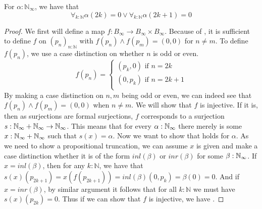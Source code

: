 \documentclass{../util/zariski-small}
\begin{document}
\begin{theorem}
  For $\alpha:\mathbb N_\infty$, 
  we have that 
  \begin{equation}\label{eqnLLPO}
    \forall_{k:\mathbb N} \alpha(2k) = 0  \vee \forall_{k:\mathbb N} \alpha(2k+1) = 0
  \end{equation}
\end{theorem}
\begin{proof}
  We first will define a map $f:B_\infty \to B_\infty \times B_\infty$. 
  Because of , it is sufficient to define $f$ on $(p_n)_{n:\mathbb N}$ with 
  $f(p_n) \wedge f(p_m) = (0,0)$ for $n\neq m$. 
  To define $f(p_n)$, we use a case distinction on whether $n$ is odd or even. 
  \begin{equation}
    f(p_n) =\begin{cases}
      (p_k,0) \text{ if } n = 2k\\
      (0,p_k) \text{ if } n = 2k+1\\
    \end{cases}
  \end{equation}
  By making a case distinction on $n,m$ being odd or even, 
  we can indeed see that $f(p_n) \wedge f(p_m) = (0,0)$ when $n\neq m$. 
  We will show that $f$ is injective. 
  If it is, then as surjections are formal surjections, $f$ corresponds to a surjection $s:\mathbb{N}_{\infty} + \mathbb{N}_{\infty} \to \mathbb{N}_{\infty}$.
  This means that for every $\alpha:\mathbb{N}_{\infty}$ there merely is some $x:\mathbb{N}_{\infty} + \mathbb{N}_{\infty}$ such that $s(x) = \alpha$. 
  Now we want to show that  holds for $\alpha$. 
  As we need to show a propositional truncation, we can assume $x$ is given and make a case distinction whether 
  it is of the form $inl(\beta)$ or $inr(\beta)$ for some $\beta:\mathbb{N}_{\infty}$. 
  If $x = inl(\beta)$, then for any $k:\mathbb N$, we have that 
  $s(x) (p_{2k+1}) = x(f(p_{2k+1})) = inl(\beta) (0,p_k)  = \beta(0) = 0$. 
  And if $x=inr(\beta)$, by similar argument it follows that for all $k:\mathbb N$
  we must have $s(x)(p_{2k}) = 0$. 
  Thus if we can show that $f$ is injective, we have .
  

\end{proof}
\end{document}
